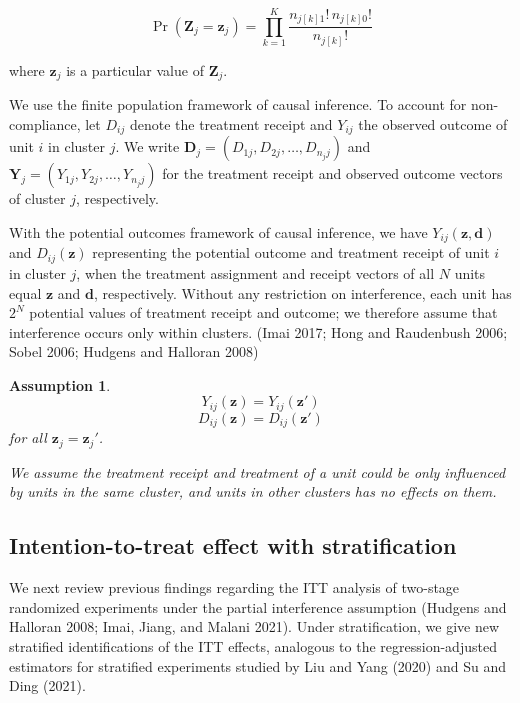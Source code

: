 \documentclass[a4paper, 12pt]{article}
\newtheorem{assumption}{Assumption}
\newcommand\red[1]{\textcolor{red}{#1}}
\begin{document}
$$\Pr(\mathbf{Z}_j = \mathbf{z}_j) = \prod^{K}_{k=1} \frac{n_{j[k]1}!\, n_{j[k]0}!}{n_{j[k]}!}$$

where $\mathbf{z}_j$ is a particular value of $\mathbf{Z}_j$.




We use the finite population framework of causal inference. To account for non-compliance, let $D_{ij}$ denote the treatment receipt and $Y_{ij}$ the observed outcome of unit $i$ in cluster $j$. We write $\mathbf{D}_j = (D_{1j}, D_{2j}, \dots, D_{n_{j}j})$ and $\mathbf{Y}_j = (Y_{1j}, Y_{2j}, \dots, Y_{n_jj})$ for the treatment receipt and observed outcome vectors of cluster $j$, respectively. 

With the potential outcomes framework of causal inference, we have $Y_{ij}(\mathbf{z}, \mathbf{d})$ and $D_{ij}(\mathbf{z})$ representing the potential outcome and treatment receipt of unit $i$ in cluster $j$, when the treatment assignment and receipt vectors of all $N$ units equal $\mathbf{z}$ and $\mathbf{d}$, respectively. Without any restriction on interference, each unit has $2^N$ potential values of treatment receipt and outcome; we therefore assume that interference occurs only within clusters. (Imai 2017; Hong and Raudenbush 2006; Sobel 2006; Hudgens and Halloran 2008)


\begin{assumption}{\quad}


    $$
    Y_{ij}(\mathbf{z}) = Y_{ij}(\mathbf{z}')
    $$
    $$
    D_{ij}(\mathbf{z}) = D_{ij}(\mathbf{z}')
    $$
    for all $\mathbf{z}_j = \mathbf{z}_j '$.
    
We assume the treatment receipt and treatment of a unit could be only influenced by units in the same cluster, and units in other clusters has no effects on them. 
\end{assumption}

\subsection{Intention-to-treat effect with stratification}

We next review previous findings regarding the ITT analysis of two-stage randomized experiments under the partial interference assumption (Hudgens and Halloran 2008; Imai, Jiang, and Malani 2021). Under stratification, we give new stratified identifications of the ITT effects, analogous to the regression-adjusted estimators for stratified experiments studied by Liu and Yang (2020) and Su and Ding (2021).
\end{document}
